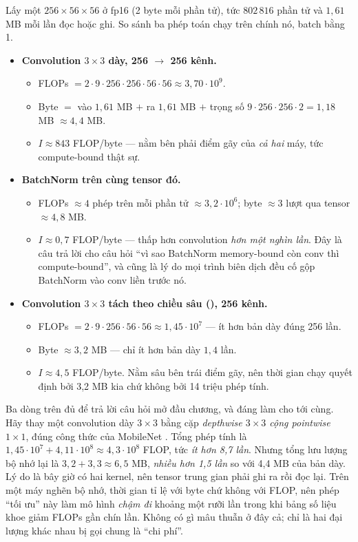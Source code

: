 \documentclass[../../deep_learning.tex]{subfiles}
\begin{document}
Lấy một  \(256\times56\times56\) ở fp16 (2 byte mỗi phần tử), tức \(802\,816\) phần tử và \(1{,}61\) MB mỗi lần đọc hoặc ghi. So sánh ba phép toán chạy trên chính nó, batch bằng 1.

\begin{itemize}
\item \textbf{Convolution \(3\times3\) dày, 256 \(\to\) 256 kênh.}
  \begin{itemize}
  \item FLOPs \(= 2\cdot 9\cdot 256\cdot 256\cdot 56\cdot 56 \approx 3{,}70\cdot 10^{9}\).
  \item Byte \(=\) vào \(1{,}61\) MB \(+\) ra \(1{,}61\) MB \(+\) trọng số \(9\cdot256\cdot256\cdot 2 = 1{,}18\) MB \(\approx 4{,}4\) MB.
  \item \(I \approx 843\) FLOP/byte --- nằm bên phải điểm gãy của \emph{cả hai} máy, tức compute-bound thật sự.
  \end{itemize}
\item \textbf{BatchNorm trên cùng tensor đó.}
  \begin{itemize}
  \item FLOPs \(\approx 4\) phép trên mỗi phần tử \(\approx 3{,}2\cdot 10^{6}\); byte \(\approx 3\) lượt qua tensor \(\approx 4{,}8\) MB.
  \item \(I \approx 0{,}7\) FLOP/byte --- thấp hơn convolution \emph{hơn một nghìn lần}. Đây là câu trả lời cho câu hỏi ``vì sao BatchNorm memory-bound còn conv thì compute-bound'', và cũng là lý do mọi trình biên dịch đều cố gộp BatchNorm vào conv liền trước nó.
  \end{itemize}
\item \textbf{Convolution \(3\times3\) tách theo chiều sâu (), 256 kênh.}
  \begin{itemize}
  \item FLOPs \(= 2\cdot 9\cdot 256\cdot 56\cdot 56 \approx 1{,}45\cdot 10^{7}\) --- ít hơn bản dày đúng 256 lần.
  \item Byte \(\approx 3{,}2\) MB --- chỉ ít hơn bản dày \(1{,}4\) lần.
  \item \(I \approx 4{,}5\) FLOP/byte. Nằm sâu bên trái điểm gãy, nên thời gian chạy quyết định bởi 3,2 MB kia chứ không bởi 14 triệu phép tính.
  \end{itemize}
\end{itemize}

Ba dòng trên đủ để trả lời câu hỏi mở đầu chương, và đáng làm cho tới cùng. Hãy thay một convolution dày \(3\times3\) bằng cặp \emph{depthwise \(3\times3\) cộng pointwise \(1\times1\)}, đúng công thức của MobileNet \cite{howard2017mobilenets}. Tổng phép tính là \(1{,}45\cdot10^{7} + 4{,}11\cdot10^{8} \approx 4{,}3\cdot 10^{8}\) FLOP, tức \emph{ít hơn 8,7 lần}. Nhưng tổng lưu lượng bộ nhớ lại là \(3{,}2 + 3{,}3 \approx 6{,}5\) MB, \emph{nhiều hơn 1,5 lần} so với 4,4 MB của bản dày. Lý do là bây giờ có hai kernel, nên tensor trung gian phải ghi ra rồi đọc lại. Trên một máy nghẽn bộ nhớ, thời gian tỉ lệ với byte chứ không với FLOP, nên phép ``tối ưu'' này làm mô hình \emph{chậm đi} khoảng một rưỡi lần trong khi bảng số liệu khoe giảm FLOPs gần chín lần. Không có gì mâu thuẫn ở đây cả; chỉ là hai đại lượng khác nhau bị gọi chung là ``chi phí''.
\end{document}
